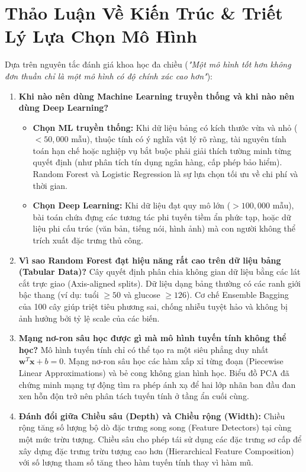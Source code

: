 \documentclass[12pt,a4paper]{report}
\begin{document}
\section{Thảo Luận Về Kiến Trúc \& Triết Lý Lựa Chọn Mô Hình}
Dựa trên nguyên tắc đánh giá khoa học đa chiều (\textit{"Một mô hình tốt hơn không đơn thuần chỉ là một mô hình có độ chính xác cao hơn"}):
\begin{enumerate}[label=\textbf{\arabic*.}]
    \item \textbf{Khi nào nên dùng Machine Learning truyền thống và khi nào nên dùng Deep Learning?}
    \begin{itemize}
        \item \textbf{Chọn ML truyền thống:} Khi dữ liệu bảng có kích thước vừa và nhỏ ($< 50,000$ mẫu), thuộc tính có ý nghĩa vật lý rõ ràng, tài nguyên tính toán hạn chế hoặc nghiệp vụ bắt buộc phải giải thích tường minh từng quyết định (như phân tích tín dụng ngân hàng, cấp phép bảo hiểm). Random Forest và Logistic Regression là sự lựa chọn tối ưu về chi phí và thời gian.
        \item \textbf{Chọn Deep Learning:} Khi dữ liệu đạt quy mô lớn ($> 100,000$ mẫu), bài toán chứa đựng các tương tác phi tuyến tiềm ẩn phức tạp, hoặc dữ liệu phi cấu trúc (văn bản, tiếng nói, hình ảnh) mà con người không thể trích xuất đặc trưng thủ công.
    \end{itemize}

    \item \textbf{Vì sao Random Forest đạt hiệu năng rất cao trên dữ liệu bảng (Tabular Data)?}
    Cây quyết định phân chia không gian dữ liệu bằng các lát cắt trực giao (Axis-aligned splits). Dữ liệu dạng bảng thường có các ranh giới bậc thang (ví dụ: tuổi $\ge 50$ và glucose $\ge 126$). Cơ chế Ensemble Bagging của 100 cây giúp triệt tiêu phương sai, chống nhiễu tuyệt hảo và không bị ảnh hưởng bởi tỷ lệ scale của các biến.

    \item \textbf{Mạng nơ-ron sâu học được gì mà mô hình tuyến tính không thể học?}
    Mô hình tuyến tính chỉ có thể tạo ra một siêu phẳng duy nhất $\mathbf{w}^T \mathbf{x} + b = 0$. Mạng nơ-ron sâu học các hàm xấp xỉ từng đoạn (Piecewise Linear Approximations) và bẻ cong không gian hình học. Biểu đồ PCA đã chứng minh mạng tự động tìm ra phép ánh xạ để hai lớp nhãn ban đầu đan xen hỗn độn trở nên phân tách tuyến tính ở tầng ẩn cuối cùng.

    \item \textbf{Đánh đổi giữa Chiều sâu (Depth) và Chiều rộng (Width):}
    Chiều rộng tăng số lượng bộ dò đặc trưng song song (Feature Detectors) tại cùng một mức trừu tượng. Chiều sâu cho phép tái sử dụng các đặc trưng sơ cấp để xây dựng đặc trưng trừu tượng cao hơn (Hierarchical Feature Composition) với số lượng tham số tăng theo hàm tuyến tính thay vì hàm mũ.


\end{enumerate}
\end{document}
